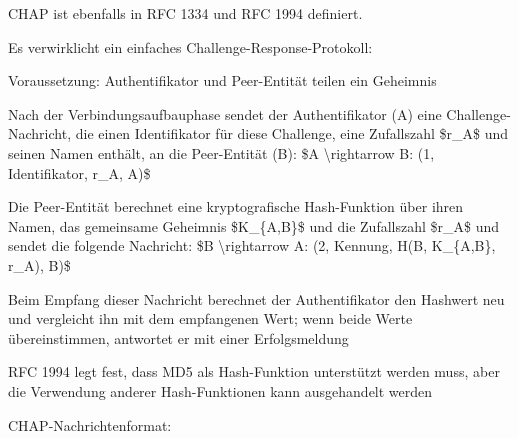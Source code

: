 \documentclass[a4paper]{article}
\begin{document}
\begin{multicols}{3}
\begin{itemize*}
            \begin{itemize*}
                  \item CHAP ist ebenfalls in RFC 1334 und RFC 1994 definiert.
                  \item Es verwirklicht ein einfaches Challenge-Response-Protokoll:
                  \begin{itemize*} \item Voraussetzung: Authentifikator und Peer-Entität teilen ein Geheimnis \item Nach der Verbindungsaufbauphase sendet der Authentifikator (A) eine Challenge-Nachricht, die einen Identifikator für diese Challenge, eine Zufallszahl \$r\_A\$ und seinen Namen enthält, an die Peer-Entität (B): \$A \textbackslash rightarrow B: (1, Identifikator, r\_A, A)\$ \item Die Peer-Entität berechnet eine kryptografische Hash-Funktion über ihren Namen, das gemeinsame Geheimnis \$K\_\{A,B\}\$ und die Zufallszahl \$r\_A\$ und sendet die folgende Nachricht: \$B \textbackslash rightarrow A: (2, Kennung, H(B, K\_\{A,B\}, r\_A), B)\$ \item Beim Empfang dieser Nachricht berechnet der Authentifikator den Hashwert neu und vergleicht ihn mit dem empfangenen Wert; wenn beide Werte übereinstimmen, antwortet er mit einer Erfolgsmeldung \item RFC 1994 legt fest, dass MD5 als Hash-Funktion unterstützt werden muss, aber die Verwendung anderer Hash-Funktionen kann ausgehandelt werden \end{itemize*}
            \end{itemize*}
            \item
            CHAP-Nachrichtenformat:


\end{itemize*}
\end{multicols}
\end{document}
